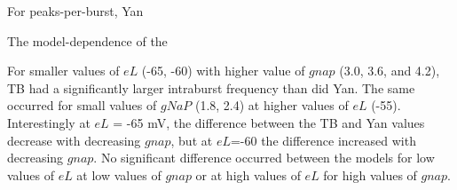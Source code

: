 \documentclass[11pt]{article}
\begin{document}
For peaks-per-burst, Yan

The model-dependence of the 

For smaller values of $eL$ (-65, -60) with higher value of $gnap$ (3.0, 3.6, and 4.2), TB had a significantly larger intraburst frequency than did Yan. The same occurred for small values of $gNaP$ (1.8, 2.4) at higher values of $eL$ (-55). Interestingly at $eL$ = -65 mV, the difference between the TB and Yan values decrease with decreasing $gnap$, but at $eL$=-60 the difference increased with decreasing $gnap$. No significant difference occurred between the models for low values of $eL$ at low values of $gnap$ or at high values of $eL$ for high values of $gnap$.

\begin{figure}[h]
\centering
	\caption{}
	\label{fig:hmPeakInBurst}
\end{figure}
\end{document}
